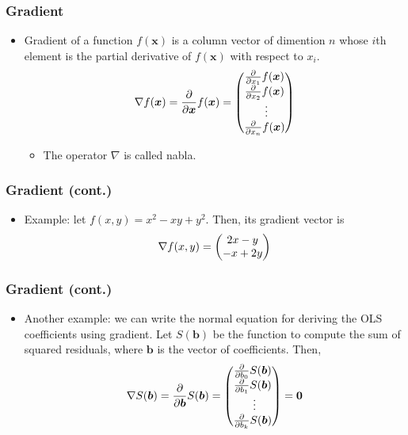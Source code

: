 \documentclass[pdflatex, 12pt]{beamer}
\begin{document}
\begin{frame}
\frametitle{Gradient}
\begin{itemize}
\item {\color{red} Gradient} of a function $f(\bm{x})$ is a column vector of dimention $n$ whose $i$th element is the partial derivative of $f(\bm{x})$ with respect to $x_i$.
 \begin{equation}
 \nabla f(\bm{x}) = \frac{\partial}{\partial \bm{x}} f(\bm{x}) = \begin{pmatrix}
 \frac{\partial}{\partial x_1} f(\bm{x}) \\
 \frac{\partial}{\partial x_2} f(\bm{x}) \\
 \ \vdots \\
 \frac{\partial}{\partial x_n} f(\bm{x}) \\
 \end{pmatrix} \notag
 \end{equation}
 \begin{itemize}
 \item The operator $\nabla$ is called {\color{red} nabla}.
 \end{itemize}
\end{itemize}
\end{frame}

\begin{frame}
\frametitle{Gradient (cont.)}
\begin{itemize}
\item Example: let $f(x, y) = x^2 - xy + y^2$. Then, its gradient vector is 
 \begin{equation}
 \nabla f(x, y) = \begin{pmatrix}
 2x - y \\
 -x + 2y \\
 \end{pmatrix} \notag
 \end{equation}
\end{itemize}
\end{frame}

\begin{frame}
\frametitle{Gradient (cont.)}
\begin{itemize}
\item Another example: we can write the normal equation for deriving the OLS coefficients using gradient. Let $S(\bm{b})$ be the function to compute the sum of squared residuals, where $\bm{b}$ is the vector of coefficients. Then, 
 \begin{equation}
 \nabla S(\bm{b}) = \frac{\partial}{\partial \bm{b}} S(\bm{b}) = \begin{pmatrix}
 \frac{\partial}{\partial b_0} S(\bm{b}) \\
 \frac{\partial}{\partial b_1} S(\bm{b}) \\
 \ \vdots \\
 \frac{\partial}{\partial b_k} S(\bm{b}) \\
 \end{pmatrix} = \bm{0} \notag
 \end{equation}
\end{itemize}
\end{frame}
\end{document}
